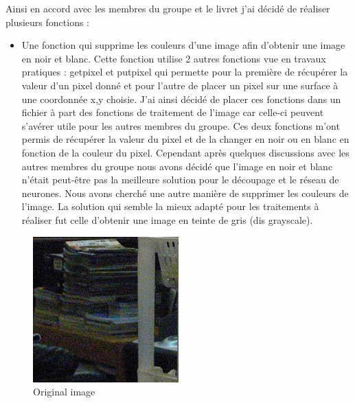 \documentclass[12pt]{report}
\begin{document}
Ainsi en accord avec les membres du groupe et le livret j’ai décidé de réaliser plusieurs fonctions :

\newpage
\begin{itemize}[label=\textbullet]
	\item Une fonction qui supprime les couleurs d’une image afin d’obtenir une image en noir et blanc. Cette fonction utilise 2 autres fonctions vue en travaux pratiques : getpixel et putpixel qui permette pour la première de récupérer la valeur d’un pixel donné et pour l’autre de placer un pixel sur une surface à une coordonnée x,y choisie. J’ai ainsi décidé de placer ces fonctions dans un fichier à part des fonctions de traitement de l’image car celle-ci peuvent s’avérer utile pour les autres membres du groupe. Ces deux fonctions m’ont permis de récupérer la valeur du pixel et de la changer en noir ou en blanc en fonction de la couleur du pixel. Cependant après quelques discussions avec les autres membres du groupe nous avons décidé que l’image en noir et blanc n’était peut-être pas la meilleure solution pour le découpage et le réseau de neurones. Nous avons cherché une autre manière de supprimer les couleurs de l’image. La solution qui semble la mieux adapté pour les traitements à réaliser fut celle d’obtenir une image en teinte de gris (dis grayscale).
\end{itemize}
\begin{figure}[H]
    \centering
    \includegraphics[width=0.5\textwidth]{noise}
    \caption{Original image}
\end{figure}
\end{document}
